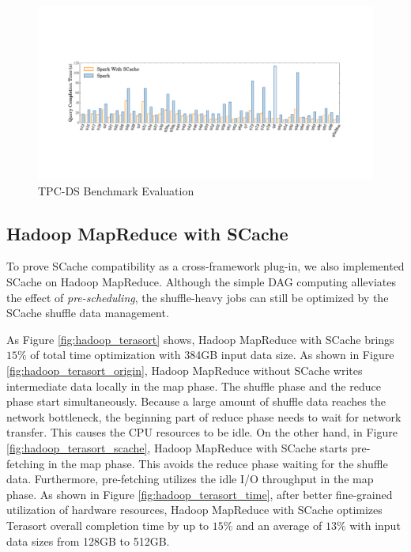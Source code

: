 \begin{figure}
	\centering
	\includegraphics[width=.9\textwidth]{fig/tpcds}
	\caption{TPC-DS Benchmark Evaluation}
	\label{fig:tpcds}
	\vspace{-1em}
\end{figure}



{\color{blue}
\subsection{Hadoop MapReduce with SCache}

To prove SCache compatibility as a cross-framework plug-in, we also implemented SCache on Hadoop MapReduce. 
Although the simple DAG computing alleviates the effect of \textit{pre-scheduling}, the shuffle-heavy jobs can still be optimized by the SCache shuffle data management.

As Figure \ref{fig:hadoop_terasort} shows, Hadoop MapReduce with SCache brings $15\%$ of total time optimization with 384GB input data size. 
As shown in Figure \ref{fig:hadoop_terasort_origin}, Hadoop MapReduce without SCache writes intermediate data locally in the map phase. The shuffle phase and the reduce phase start simultaneously. Because a large amount of shuffle data reaches the network bottleneck, the beginning part of reduce phase needs to wait for network transfer. This causes the CPU resources to be idle. 
On the other hand, in Figure \ref{fig:hadoop_terasort_scache}, Hadoop MapReduce with SCache starts pre-fetching in the map phase. This avoids the reduce phase waiting for the shuffle data. Furthermore, pre-fetching utilizes the idle I/O throughput in the map phase. As shown in Figure \ref{fig:hadoop_terasort_time}, after better fine-grained utilization of hardware resources, Hadoop MapReduce with SCache optimizes Terasort overall completion time by up to $15\%$ and an average of $13\%$ with input data sizes from 128GB to 512GB.
}



